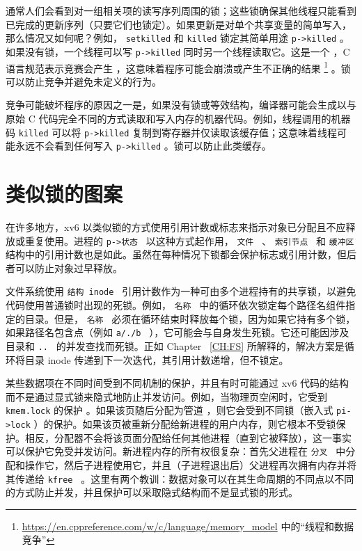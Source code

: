 \documentclass[UTF8]{article}
\begin{document}
通常人们会看到对一组相关项的读写序列周围的锁；这些锁确保其他线程只能看到已完成的更新序列（只要它们也锁定）。如果更新是对单个共享变量的简单写入，那么情况又如何呢？例如，
    \texttt{setkilled}    和    \texttt{killed}   
        锁定其简单用途
    \lstinline{p->killed}    。如果没有锁，一个线程可以写
    \lstinline{p->killed}    同时另一个线程读取它。这是一个        ，C 语言规范表示竞赛会产生        ，这意味着程序可能会崩溃或产生不正确的结果    \footnote{   \url{https://en.cppreference.com/w/c/language/memory_model}    中的“线程和数据竞争”  }    。锁可以防止竞争并避免未定义的行为。  

竞争可能破坏程序的原因之一是，如果没有锁或等效结构，编译器可能会生成以与原始 C 代码完全不同的方式读取和写入内存的机器代码。例如，线程调用的机器码
    \texttt{killed}    可以将    \lstinline{p->killed}    复制到寄存器并仅读取该缓存值；这意味着线程可能永远不会看到任何写入
    \lstinline{p->killed}    。锁可以防止此类缓存。  

   \section{类似锁的图案  }     

在许多地方，xv6 以类似锁的方式使用引用计数或标志来指示对象已分配且不应释放或重复使用。进程的  {    \tt    p->状态   }  以这种方式起作用， {    \tt    文件   }  、  {    \tt    索引节点   }  和  {    \tt    缓冲区   }  结构中的引用计数也是如此。虽然在每种情况下锁都会保护标志或引用计数，但后者可以防止对象过早释放。  

文件系统使用 {    \tt    结构 inode   } 引用计数作为一种可由多个进程持有的共享锁，以避免代码使用普通锁时出现的死锁。例如， {    \tt    名称   }         中的循环依次锁定每个路径名组件指定的目录。但是，  {    \tt    名称   }  必须在循环结束时释放每个锁，因为如果它持有多个锁，如果路径名包含点（例如  {    \tt    a/./b   }  ），它可能会与自身发生死锁。它还可能因涉及目录和  {    \tt    ..   }  的并发查找而死锁。正如 Chapter~    \ref{CH:FS}    所解释的，解决方案是循环将目录 inode 传递到下一次迭代，其引用计数递增，但不锁定。  

某些数据项在不同时间受到不同机制的保护，并且有时可能通过 xv6 代码的结构而不是通过显式锁来隐式地防止并发访问。例如，当物理页空闲时，它受到    \texttt{kmem.lock}    的保护
        。如果该页随后分配为管道        ，则它会受到不同锁（嵌入式    \lstinline{pi->lock}    ）的保护。如果该页被重新分配给新进程的用户内存，则它根本不受锁保护。相反，分配器不会将该页面分配给任何其他进程（直到它被释放），这一事实可以保护它免受并发访问。新进程内存的所有权很复杂：首先父进程在  {    \tt    分叉   }  中分配和操作它，然后子进程使用它，并且（子进程退出后）父进程再次拥有内存并将其传递给  {    \tt    kfree   }  。这里有两个教训：数据对象可以在其生命周期的不同点以不同的方式防止并发，并且保护可以采取隐式结构而不是显式锁的形式。  
\end{document}
